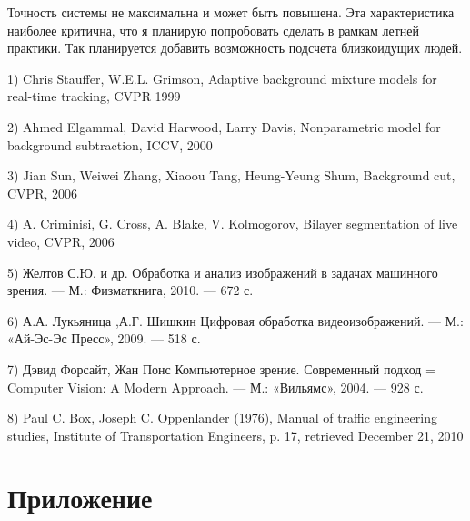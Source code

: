 \documentclass[12pt]{article}
\begin{document}
Точность системы не максимальна и может быть повышена. Эта характеристика наиболее критична, что я планирую попробовать сделать в рамкам летней практики. Так планируется добавить возможность подсчета близкоидущих людей. 
		
	


\newpage
{}

			
	
\hspace{\parindent} \hspace{\parindent}

1) Chris Stauffer, W.E.L. Grimson, Adaptive background mixture models for real-time tracking, CVPR 1999

2) Ahmed Elgammal, David Harwood, Larry Davis, Nonparametric model for background subtraction, ICCV, 2000

3) Jian Sun, Weiwei Zhang, Xiaoou Tang, Heung-Yeung Shum, Background cut, CVPR, 2006

4) A. Criminisi, G. Cross, A. Blake, V. Kolmogorov, Bilayer segmentation of live video, CVPR, 2006

5) Желтов С.Ю. и др. Обработка и анализ изображений в задачах машинного зрения. — М.: Физматкнига, 2010. — 672 с.

6) А.А. Лукьяница ,А.Г. Шишкин Цифровая обработка видеоизображений. — М.: «Ай-Эс-Эс Пресс», 2009. — 518 с. 

7) Дэвид Форсайт, Жан Понс Компьютерное зрение. Современный подход = Computer Vision: A Modern Approach. — М.: «Вильямс», 2004. — 928 с. 

8) Paul C. Box, Joseph C. Oppenlander (1976), Manual of traffic engineering studies, Institute of Transportation Engineers, p. 17, retrieved December 21, 2010
	\newpage	%
	\part*{Приложение}
		\begin{lstlisting}[language=Python]

	\end{lstlisting}




%

	\newpage	
\end{document}
